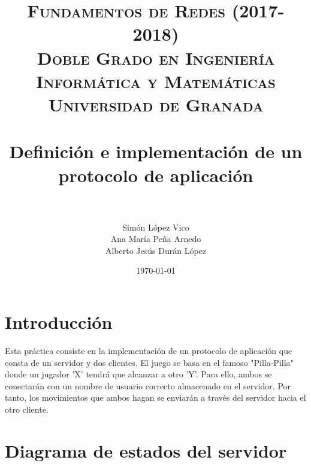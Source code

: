 

\title{	
	\normalfont \normalsize 
	\textsc{\textbf{Fundamentos de Redes (2017-2018)} \\ Doble Grado en Ingeniería Informática y Matemáticas \\ Universidad de Granada} \\ [25pt] 
	\horrule{0.5pt} \\[0.4cm]
	\huge Definición e implementación de un \\ protocolo de aplicación \\ 
	\horrule{2pt} \\[0.5cm] 
}

\author{Simón López Vico \\ Ana María Peña Arnedo \\ Alberto Jesús Durán López} 
\date{\normalsize\today}



	\maketitle       %
	\newpage 
	\tableofcontents %
	\newpage
	
	

	
	
\section{Introducción}
	
	
Esta práctica consiste en la implementación de un protocolo de aplicación que consta
de un servidor y dos clientes. El juego se basa en el famoso "Pilla-Pilla"   donde 
un jugador 'X' tendrá que alcanzar a otro 'Y'. Para ello, ambos se conectarán con un nombre de usuario correcto almacenado en el servidor. Por tanto, los movimientos que ambos hagan se enviarán a través del servidor hacia el otro cliente.
		
	
	
	
\section{Diagrama de estados del servidor}

